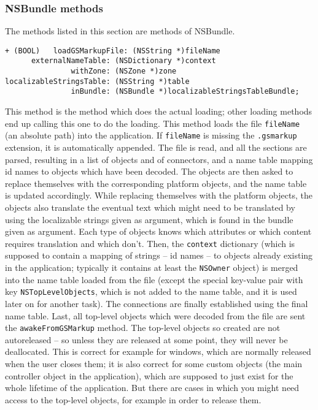 \subsubsection{NSBundle methods}
The methods listed in this section are methods of NSBundle.
\begin{verbatim}
+ (BOOL)   loadGSMarkupFile: (NSString *)fileName
      externalNameTable: (NSDictionary *)context
               withZone: (NSZone *)zone
localizableStringsTable: (NSString *)table
               inBundle: (NSBundle *)localizableStringsTableBundle;
\end{verbatim}
This method is the method which does the actual loading; other loading
methods end up calling this one to do the loading.  This method loads
the file \texttt{fileName} (an absolute path) into the application.
If \texttt{fileName} is missing the \texttt{.gsmarkup} extension, it is
automatically appended.  The file is read, and all the sections are
parsed, resulting in a list of objects and of connectors, and a name
table mapping id names to objects which have been decoded.  The
objects are then asked to replace themselves with the corresponding
platform objects, and the name table is updated accordingly.  While
replacing themselves with the platform objects, the objects also
translate the eventual text which might need to be translated by using
the localizable strings given as argument, which is found in the
bundle given as argument.  Each type of objects knows which attributes
or which content requires translation and which don't.  Then, the
\texttt{context} dictionary (which is supposed to contain a mapping of
strings -- id names -- to objects already existing in the application;
typically it contains at least the \texttt{NSOwner} object) is merged
into the name table loaded from the file (except the special key-value
pair with key \texttt{NSTopLevelObjects}, which is not added to the
name table, and it is used later on for another task).  The
connections are finally established using the final name table.  Last,
all top-level objects which were decoded from the file are sent the
\texttt{awakeFromGSMarkup} method.  The top-level objects so created are
not autoreleased -- so unless they are released at some point, they
will never be deallocated.  This is correct for example for windows,
which are normally released when the user closes them; it is also
correct for some custom objects (the main controller object in the
application), which are supposed to just exist for the whole lifetime
of the application.  But there are cases in which you might need
access to the top-level objects, for example in order to release them.

